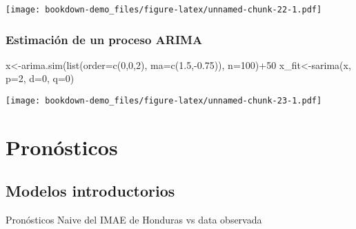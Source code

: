 \documentclass[
]{book}
\newenvironment{Shaded}{\begin{snugshade}}{\end{snugshade}}
\newcommand{\AttributeTok}[1]{\textcolor[rgb]{0.77,0.63,0.00}{#1}}
\newcommand{\DecValTok}[1]{\textcolor[rgb]{0.00,0.00,0.81}{#1}}
\newcommand{\FloatTok}[1]{\textcolor[rgb]{0.00,0.00,0.81}{#1}}
\newcommand{\FunctionTok}[1]{\textcolor[rgb]{0.00,0.00,0.00}{#1}}
\newcommand{\NormalTok}[1]{#1}
\newcommand{\OtherTok}[1]{\textcolor[rgb]{0.56,0.35,0.01}{#1}}
\newcommand{\SpecialCharTok}[1]{\textcolor[rgb]{0.00,0.00,0.00}{#1}}
\begin{document}
\texttt{[image: bookdown-demo\_files/figure-latex/unnamed-chunk-22-1.pdf]}

\hypertarget{estimaciuxf3n-de-un-proceso-arima}{%
\subsection{Estimación de un proceso ARIMA}\label{estimaciuxf3n-de-un-proceso-arima}}

\begin{Shaded}
\begin{Highlighting}[]
\NormalTok{x}\OtherTok{\textless{}{-}}\FunctionTok{arima.sim}\NormalTok{(}\FunctionTok{list}\NormalTok{(}\AttributeTok{order=}\FunctionTok{c}\NormalTok{(}\DecValTok{0}\NormalTok{,}\DecValTok{0}\NormalTok{,}\DecValTok{2}\NormalTok{), }\AttributeTok{ma=}\FunctionTok{c}\NormalTok{(}\FloatTok{1.5}\NormalTok{,}\SpecialCharTok{{-}}\FloatTok{0.75}\NormalTok{)), }\AttributeTok{n=}\DecValTok{100}\NormalTok{)}\SpecialCharTok{+}\DecValTok{50}
\NormalTok{x\_fit}\OtherTok{\textless{}{-}}\FunctionTok{sarima}\NormalTok{(x, }\AttributeTok{p=}\DecValTok{2}\NormalTok{, }\AttributeTok{d=}\DecValTok{0}\NormalTok{, }\AttributeTok{q=}\DecValTok{0}\NormalTok{)}
\end{Highlighting}
\end{Shaded}

\texttt{[image: bookdown-demo\_files/figure-latex/unnamed-chunk-23-1.pdf]}

\begin{Shaded}
\end{Shaded}

\hypertarget{pronuxf3sticos}{%
\chapter{Pronósticos}\label{pronuxf3sticos}}

\hypertarget{modelos-introductorios}{%
\section{Modelos introductorios}\label{modelos-introductorios}}

Pronósticos Naive del IMAE de Honduras vs data observada
\end{document}
